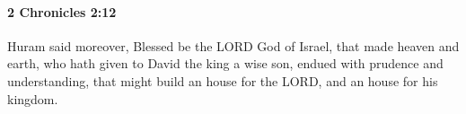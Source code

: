 
		\paragraph{2 Chronicles 2:12} %
			\label{2CHRONICLES-2-12}

			Huram said moreover, Blessed be the LORD God of Israel, that made heaven and earth, who hath given to David the king a wise son, endued with prudence and understanding, that might build an house for the LORD, and an house for his kingdom.


